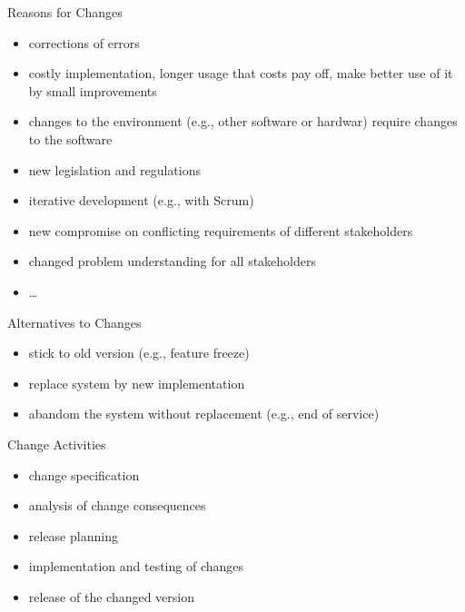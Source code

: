\begin{frame}{\insertsubsection}
	\begin{fancycolumns}
		\begin{definition}{Reasons for Changes \mysource{\sommerville}}
			\begin{itemize}
				\item corrections of errors
				\item costly implementation, longer usage that costs pay off, make better use of it by small improvements
				\item changes to the environment (e.g., other software or hardwar) require changes to the software
				\item new legislation and regulations
				\item iterative development (e.g., with Scrum)
				\item new compromise on conflicting requirements of different stakeholders
				\item changed problem understanding for all stakeholders
				\item \ldots
			\end{itemize}
		\end{definition}
	\nextcolumn
		\begin{note}{Alternatives to Changes}
			\begin{itemize}
				\item stick to old version (e.g., feature freeze)
				\item replace system by new implementation
				\item abandom the system without replacement (e.g., end of service)
			\end{itemize}
		\end{note}
		\begin{definition}{Change Activities \mysource{\sommerville}}
			\begin{itemize}
				\item change specification
				\item analysis of change consequences
				\item release planning
				\item implementation and testing of changes
				\item release of the changed version
			\end{itemize}
		\end{definition}
	\end{fancycolumns}
\end{frame}

